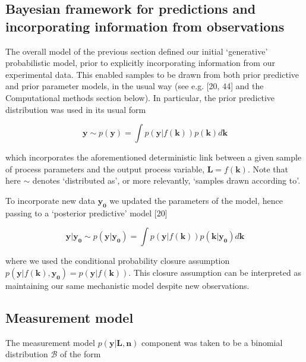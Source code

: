 \documentclass[10pt,letterpaper]{article}
\begin{document}
\subsection{Bayesian framework for predictions and incorporating
information from
observations}\label{bayesian-framework-for-predictions-and-incorporating-information-from-observations}

The overall model of the previous section defined our initial
`generative' probabilistic model, prior to explicitly incorporating
information from our experimental data. This enabled samples to be drawn
from both prior predictive and prior parameter models, in the usual way
(see e.g. {[}20, 44{]} and the Computational methods section below). In
particular, the prior predictive distribution was used in its usual form

\begin{equation}\mathbf{y} \sim p(\mathbf{y}) = \int p(\mathbf{y}|f(\mathbf{k}))p(\mathbf{k})d\mathbf{k}\label{eq:prior-predictive}\end{equation}

which incorporates the aforementioned deterministic link between a given
sample of process parameters and the output process variable,
\(\mathbf{L}=f(\mathbf{k})\). Note that here \(\sim\) denotes
`distributed as', or more relevantly, `samples drawn according to'.

To incorporate new data \(\mathbf{y_0}\) we updated the parameters of
the model, hence passing to a `posterior predictive' model {[}20{]}

\begin{equation}\mathbf{y} | \mathbf{y_0} \sim p(\mathbf{y}|\mathbf{y_0}) = \int p(\mathbf{y}|f(\mathbf{k}))p(\mathbf{k}|\mathbf{y_0})d\mathbf{k}\label{eq:posterior-predictive}\end{equation}

where we used the conditional probability closure assumption
\(p(\mathbf{y}|f(\mathbf{k}),\mathbf{y_0}) = p(\mathbf{y}|f(\mathbf{k}))\).
This closure assumption can be interpreted as maintaining our same
mechanistic model despite new observations.

\subsection{Measurement model}\label{measurement-model}

The measurement model \(p(\mathbf{y}|\mathbf{L},\mathbf{n})\) component
was taken to be a binomial distribution \(\mathcal{B}\) of the form
\end{document}

